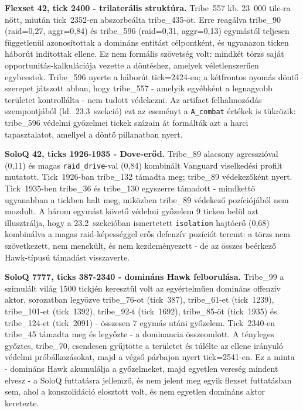 ﻿\documentclass[a4paper,12pt]{report}
\begin{document}
\textbf{Flexset 42, tick 2400 - trilaterális struktúra.}
Tribe~557 kb. 23~000 tile-ra nőtt, miután tick~2352-en abszorbeálta tribe\_435-öt.
Erre reagálva tribe\_90 (raid=0{,}27, aggr=0{,}84) és tribe\_596 (raid=0{,}31,
aggr=0{,}13) egymástól teljesen függetlenül azonosítottak a domináns entitást
célpontként, és ugyanazon ticken háborút indítottak ellene.
Ez nem formális szövetség volt: mindkét törzs saját opportunitás-kalkulációja
vezette a döntéshez, amelyek véletlenszerűen egybeestek.
Tribe\_596 nyerte a háborút tick=2424-en; a kétfrontos nyomás döntő szerepet
játszott abban, hogy tribe\_557 - amelyik egyébként a legnagyobb területet kontrollálta -
nem tudott védekezni. Az artifact felhalmozódás szempontjából (ld.~23.3~szekció)
ezt az eseményt a \texttt{A\_combat} értékek is tükrözik: tribe\_596 védelmi
győzelmei tickek százain át formálták azt a harci tapasztalatot, amellyel a
döntő pillanatban nyert.

\textbf{SoloQ 42, ticks 1926-1935 - Dove-erőd.}
Tribe\_89 alacsony agresszióval (0{,}11) és magas \texttt{raid\_drive}-val (0{,}84)
kombinált Vanguard viselkedési profilt mutatott. Tick~1926-ban tribe\_132 támadta meg;
tribe\_89 védekezőként nyert. Tick~1935-ben tribe\_36 és tribe\_130 egyszerre támadott -
mindkettő ugyanabban a tickben halt meg, miközben tribe\_89 védekező pozíciójából
nem mozdult. A három egymást követő védelmi győzelem 9 ticken belül azt illusztrálja,
hogy a 23.2~szekcióban ismertetett \texttt{isolation} hajtóerő (0{,}68)
kombinálva a magas raid-képességgel erős defenzív pozíciót teremt: a törzs nem
szövetkezett, nem menekült, és nem kezdeményezett - de az összes beérkező Hawk-típusú
támadást visszaverte.

\textbf{SoloQ 7777, ticks 387-2340 - domináns Hawk felborulása.}
Tribe\_99 a szimulált világ 1500 tickjén keresztül volt az egyértelműen domináns
offenzív aktor, sorozatban legyőzve tribe\_76-ot (tick~387), tribe\_61-et (tick~1239),
tribe\_101-et (tick~1392), tribe\_92-t (tick~1692), tribe\_85-öt (tick~1935) és
tribe\_124-et (tick~2091) - összesen 7 egymás utáni győzelem.
Tick~2340-en tribe\_45 támadta meg és legyőzte - a dominancia összeomlott.
A tényleges győztes, tribe\_70, csendesen gyűjtötte a területet és túlélte az
ellene irányuló védelmi próbálkozásokat, majd a végső párbajon nyert tick=2541-en.
Ez a minta - domináns Hawk akumulálja a győzelmeket, majd egyetlen vereség mindent
elvesz - a SoloQ futtatásra jellemző, és nem jelent meg egyik flexset futtatásban sem,
ahol a konszolidáció elosztott volt, és nem egyetlen domináns aktor keretezte.
\end{document}

